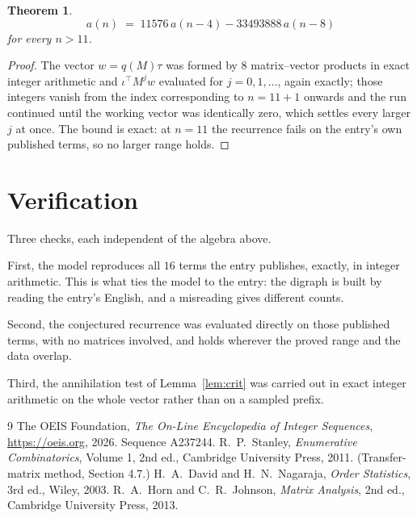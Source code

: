 \documentclass[11pt,a4paper]{article}
\theoremstyle{plain}
\newtheorem{theorem}{Theorem}
\theoremstyle{definition}
\begin{document}
\begin{theorem}
\[
a(n)\;=\;11576\,a(n-4) - 33493888\,a(n-8)
\]
for every $n>11$.
\end{theorem}

\begin{proof}
The vector $w=q(M)\tau$ was formed by $8$ matrix--vector products in exact integer
arithmetic and $\iota^{\!\top}M^{j}w$ evaluated for $j=0,1,\dots$, again exactly; those
integers vanish from the index corresponding to $n=11+1$ onwards and the run continued
until the working vector was identically zero, which settles every larger $j$ at once. The bound is exact: at $n=11$ the recurrence fails on the entry's own published terms, so no larger range holds.
\end{proof}

\section{Verification}

Three checks, each independent of the algebra above.

First, the model reproduces all $16$ terms the entry publishes, exactly, in integer
arithmetic. This is what ties the model to the entry: the digraph is built by reading the
entry's English, and a misreading gives different counts.

Second, the conjectured recurrence was evaluated directly on those published terms, with no
matrices involved, and holds wherever the proved range and the data overlap.

Third, the annihilation test of Lemma~\ref{lem:crit} was carried out in exact integer
arithmetic on the whole vector rather than on a sampled prefix.

\begin{thebibliography}{9}
 The OEIS Foundation, \emph{The On-Line Encyclopedia of Integer
Sequences}, \url{https://oeis.org}, 2026. Sequence A237244.
 R.~P.~Stanley, \emph{Enumerative Combinatorics}, Volume 1, 2nd ed.,
Cambridge University Press, 2011. (Transfer-matrix method, Section 4.7.)
 H.~A.~David and H.~N.~Nagaraja, \emph{Order Statistics}, 3rd ed., Wiley,
2003.
 R.~A.~Horn and C.~R.~Johnson, \emph{Matrix Analysis}, 2nd ed., Cambridge
University Press, 2013.
\end{thebibliography}
\end{document}
